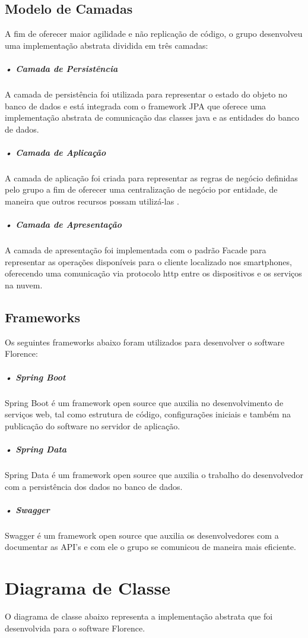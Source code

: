 \documentclass[portuguese,oneside]{tcc}
\begin{document}
\subsection{Modelo de Camadas}
A fim de oferecer maior agilidade e não replicação de código, o grupo desenvolveu uma implementação abstrata dividida em três camadas:

\subparagraph{• Camada de Persistência}
A camada de persistência foi utilizada para representar o estado do objeto no banco de dados \cite{CAMADASPERSISTENCIA} e está integrada com o framework JPA que oferece uma implementação abstrata de comunicação das classes java e as entidades do banco de dados.

\subparagraph{• Camada de Aplicação}
A camada de aplicação foi criada para representar as regras de negócio definidas pelo grupo a fim de oferecer uma centralização de negócio por entidade, de maneira que outros recursos possam utilizá-las \cite{CAMADAAPLICACAO}.


\subparagraph{• Camada de Apresentação}
A camada de apresentação foi implementada com o padrão Facade para representar as operações disponíveis para o cliente localizado nos smartphones, oferecendo uma comunicação via protocolo http entre os dispositivos e os serviços na nuvem.

\subsection{Frameworks}
Os seguintes frameworks abaixo foram utilizados para desenvolver o software Florence:

\subparagraph{• Spring Boot}
Spring Boot é um framework open source que auxilia no desenvolvimento de serviços web, tal como estrutura de código, configurações iniciais e também na publicação do software no servidor de aplicação.

\subparagraph{• Spring Data}
Spring Data é um framework open source que auxilia o trabalho do desenvolvedor com a persistência dos dados no banco de dados.

\subparagraph{• Swagger}
Swagger é um framework open source que auxilia os desenvolvedores com a documentar as API's e com ele o grupo se comunicou de maneira mais eficiente.

\newpage

\section{Diagrama de Classe}
O diagrama de classe abaixo representa a implementação abstrata que foi desenvolvida para o software Florence.
\end{document}
